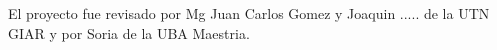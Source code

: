 El proyecto fue revisado por Mg Juan Carlos Gomez y Joaquin ..... de la UTN GIAR y por Soria de la UBA Maestria.